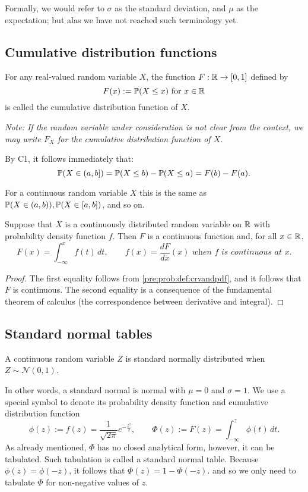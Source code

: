 \documentclass[10pt, a4paper]{article}
\begin{document}
Formally,
we would refer to $\sigma$ as the standard deviation,
and $\mu$ as the expectation;
but alas we have not reached such terminology yet.

\subsection{Cumulative distribution functions}
\begin{definition}
    For any real-valued random variable $X$,
    the function $F: \R \rightarrow [0, 1]$ defined by
    \[
    F(x) := \P(X \leq x)\text{ for } x \in \R
    \]
    is called the cumulative distribution function of $X$.
\end{definition}

\textit{Note: If the random variable under consideration is not clear from the context,
we may write $F_X$ for the cumulative distribution function of $X$}.

By C1,
it follows immediately that:
\[
\P(X \in (a, b]) = \P(X \leq b) - \P(X \leq a) = F(b) - F(a).
\]

For a continuous random variable $X$ this is the same as $\P(X \in (a, b)), \P(X \in [a, b])$,
and so on.

\begin{theorem}
    Suppose that $X$ is a continuously distributed random variable on $\R$ with probability density function $f$.
    Then $F$ is a continuous function and,
    for all $x \in \R$,
    \[
    F(x) = \int_{-\infty}^{x}f(t)\,dt,\qquad f(x) = \frac{dF}{dx}(x)\textit{ when $f$ is continuous at $x$}.
    \]
    \begin{proof}
        The first equality follows from \autoref{pre:prob:def:crvandpdf},
        and it follows that $F$ is continuous.
        The second equality is a consequence of the fundamental theorem of calculus (the correspondence between derivative and integral).
    \end{proof}
\end{theorem}

\subsection{Standard normal tables}
\begin{definition}
    A continuous random variable $Z$ is standard normally distributed when $Z \sim \mathcal{N}(0, 1)$.
\end{definition}
In other words,
a standard normal is normal with $\mu = 0$ and $\sigma = 1$.
We use a special symbol to denote its probability density function and cumulative distribution function
\[
\phi(z) := f(z) = \frac{1}{\sqrt{2\pi}}e ^ {-\frac{z ^ 2}{2}},\qquad\Phi(z) := F(z) = \int_{-\infty}^{z}\phi(t)\,dt.
\]
As already mentioned,
$\Phi$ has no closed analytical form,
however,
it can be tabulated.
Such tabulation is called a standard normal table.
Because $\phi(z) = \phi(-z)$,
it follows that $\Phi(z) = 1 - \Phi(-z)$.
and so we only need to tabulate $\Phi$ for non-negative values of $z$.
\end{document}
